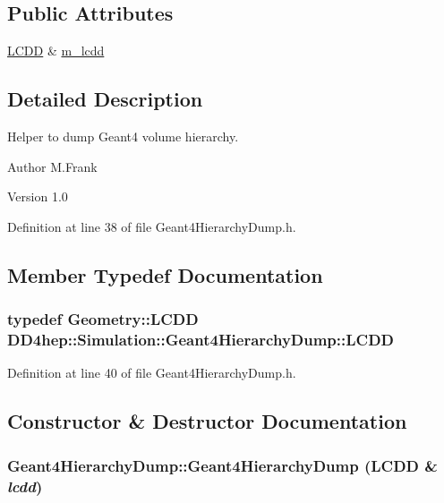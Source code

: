 \subsection*{Public Attributes}
\begin{DoxyCompactItemize}
\item 
\hyperlink{class_d_d4hep_1_1_geometry_1_1_l_c_d_d}{LCDD} \& \hyperlink{class_d_d4hep_1_1_simulation_1_1_geant4_hierarchy_dump_a28785ab85c2dfa536abf8050804796d7}{m\_\-lcdd}
\end{DoxyCompactItemize}


\subsection{Detailed Description}
Helper to dump Geant4 volume hierarchy. \begin{DoxyAuthor}{Author}
M.Frank 
\end{DoxyAuthor}
\begin{DoxyVersion}{Version}
1.0 
\end{DoxyVersion}


Definition at line 38 of file Geant4HierarchyDump.h.

\subsection{Member Typedef Documentation}
\hypertarget{class_d_d4hep_1_1_simulation_1_1_geant4_hierarchy_dump_a4b0ebc3e2346d0ff1c40293d4610f560}{
\subsubsection[{LCDD}]{\setlength{\rightskip}{0pt plus 5cm}typedef {\bf Geometry::LCDD} {\bf DD4hep::Simulation::Geant4HierarchyDump::LCDD}}}
\label{class_d_d4hep_1_1_simulation_1_1_geant4_hierarchy_dump_a4b0ebc3e2346d0ff1c40293d4610f560}


Definition at line 40 of file Geant4HierarchyDump.h.

\subsection{Constructor \& Destructor Documentation}
\hypertarget{class_d_d4hep_1_1_simulation_1_1_geant4_hierarchy_dump_afcdcc1f61c37b8fcc8c005677b9c2383}{
\subsubsection[{Geant4HierarchyDump}]{\setlength{\rightskip}{0pt plus 5cm}Geant4HierarchyDump::Geant4HierarchyDump ({\bf LCDD} \& {\em lcdd})}}
\label{class_d_d4hep_1_1_simulation_1_1_geant4_hierarchy_dump_afcdcc1f61c37b8fcc8c005677b9c2383}


